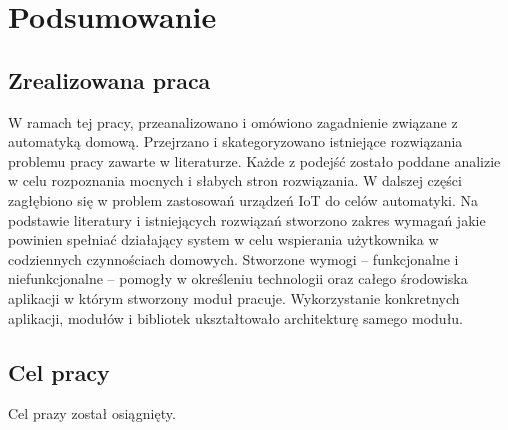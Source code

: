 
\chapter*{Podsumowanie}
\section*{Zrealizowana praca}
W ramach tej pracy, przeanalizowano i omówiono zagadnienie związane z automatyką domową. Przejrzano i skategoryzowano istniejące rozwiązania problemu pracy zawarte w literaturze. Każde z podejść zostało poddane analizie w celu rozpoznania mocnych i słabych stron rozwiązania. W dalszej części zagłębiono się w problem zastosowań urządzeń IoT do celów automatyki. Na podstawie literatury i istniejących rozwiązań stworzono zakres wymagań jakie powinien spełniać działający system w celu wspierania użytkownika w codziennych czynnościach domowych. Stworzone wymogi -- funkcjonalne i niefunkcjonalne -- pomogły w określeniu technologii oraz całego środowiska aplikacji w którym stworzony moduł pracuje. Wykorzystanie konkretnych aplikacji, modułów i bibliotek ukształtowało architekturę samego modułu.

\section*{Cel pracy}
Cel prazy został osiągnięty.
